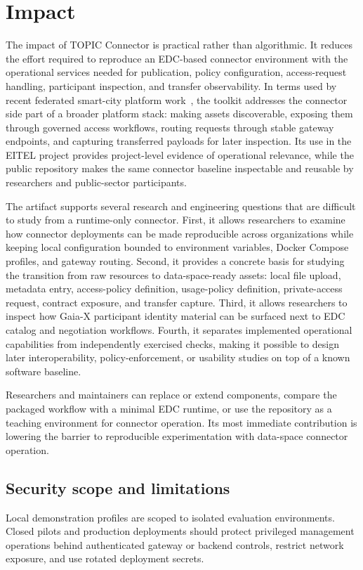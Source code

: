 \documentclass[a4paper,fleqn]{cas-dc}
\begin{document}
\section{Impact}
The impact of TOPIC Connector is practical rather than algorithmic. It reduces the effort required to reproduce an EDC-based connector environment with the operational services needed for publication, policy configuration, access-request handling, participant inspection, and transfer observability. In terms used by recent federated smart-city platform work~\cite{b19}, the toolkit addresses the connector side part of a broader platform stack: making assets discoverable, exposing them through governed access workflows, routing requests through stable gateway endpoints, and capturing transferred payloads for later inspection. Its use in the EITEL project provides project-level evidence of operational relevance, while the public repository makes the same connector baseline inspectable and reusable by researchers and public-sector participants.

The artifact supports several research and engineering questions that are difficult to study from a runtime-only connector. First, it allows researchers to examine how connector deployments can be made reproducible across organizations while keeping local configuration bounded to environment variables, Docker Compose profiles, and gateway routing. Second, it provides a concrete basis for studying the transition from raw resources to data-space-ready assets: local file upload, metadata entry, access-policy definition, usage-policy definition, private-access request, contract exposure, and transfer capture. Third, it allows researchers to inspect how Gaia-X participant identity material can be surfaced next to EDC catalog and negotiation workflows. Fourth, it separates implemented operational capabilities from independently exercised checks, making it possible to design later interoperability, policy-enforcement, or usability studies on top of a known software baseline.

Researchers and maintainers can replace or extend components, compare the packaged workflow with a minimal EDC runtime, or use the repository as a teaching environment for connector operation. Its most immediate contribution is lowering the barrier to reproducible experimentation with data-space connector operation.

\subsection{Security scope and limitations}
Local demonstration profiles are scoped to isolated evaluation environments. Closed pilots and production deployments should protect privileged management operations behind authenticated gateway or backend controls, restrict network exposure, and use rotated deployment secrets.
\end{document}
